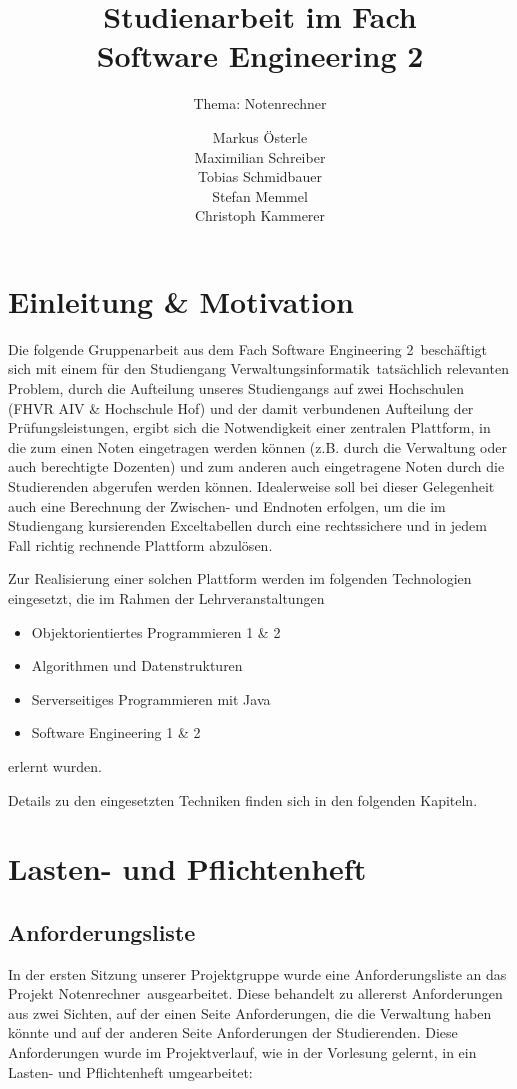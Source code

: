 \documentclass[12pt,a4paper,parskip]{scrreprt}
\author{Markus Österle \\ Maximilian Schreiber \\ Tobias Schmidbauer \\ Stefan Memmel \\ Christoph Kammerer}
\title{Studienarbeit im Fach \\ \glqq Software Engineering 2\grqq}
\subtitle{Thema: Notenrechner}
\date{}
\begin{document}
\maketitle
\tableofcontents
\chapter{Einleitung \& Motivation}
Die folgende Gruppenarbeit aus dem Fach \glqq Software Engineering 2\grqq\ beschäftigt sich mit einem für den Studiengang \glqq Verwaltungsinformatik\grqq\ tatsächlich relevanten Problem, durch die Aufteilung unseres Studiengangs auf zwei Hochschulen (FHVR AIV \& Hochschule Hof) und der damit verbundenen Aufteilung der Prüfungsleistungen, ergibt sich die Notwendigkeit einer zentralen Plattform, in die zum einen Noten eingetragen werden können (z.B. durch die Verwaltung oder auch berechtigte Dozenten) und zum anderen auch eingetragene Noten durch die Studierenden abgerufen werden können. Idealerweise soll bei dieser Gelegenheit auch eine Berechnung der Zwischen- und Endnoten erfolgen, um die im Studiengang kursierenden Exceltabellen durch eine rechtssichere und in jedem Fall richtig rechnende Plattform abzulösen.

Zur Realisierung einer solchen Plattform werden im folgenden Technologien eingesetzt, die im Rahmen der Lehrveranstaltungen 
\begin{itemize}
\item Objektorientiertes Programmieren 1 \& 2
\item Algorithmen und Datenstrukturen
\item Serverseitiges Programmieren mit Java
\item Software Engineering 1 \& 2
\end{itemize}
erlernt wurden. 

Details zu den eingesetzten Techniken finden sich in den folgenden Kapiteln.
\chapter{Lasten- und Pflichtenheft}
\section{Anforderungsliste}
In der ersten Sitzung unserer Projektgruppe wurde eine Anforderungsliste an das Projekt \glqq Notenrechner\grqq\ ausgearbeitet. Diese behandelt zu allererst Anforderungen aus zwei Sichten, auf der einen Seite Anforderungen, die die Verwaltung haben könnte und auf der anderen Seite Anforderungen der Studierenden. Diese Anforderungen wurde im Projektverlauf, wie in der Vorlesung gelernt, in ein Lasten- und Pflichtenheft umgearbeitet:
\end{document}

